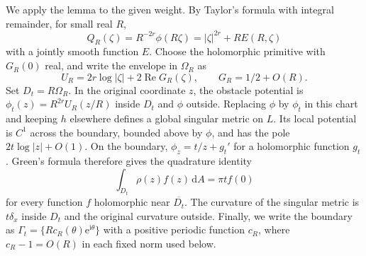 We apply the lemma to the given weight. By Taylor's formula with integral remainder, for small real $R$,
\[
 Q_R(\zeta)=R^{-2r}\phi(R\zeta)
 =|\zeta|^{2r}+R E(R,\zeta)
\]
with a jointly smooth function $E$. Choose the holomorphic primitive with $G_R(0)$ real, and write the envelope in $\Omega_R$ as
\[
 U_R=2r\log|\zeta|+2\operatorname{Re} G_R(\zeta),\qquad
 G_R=1/2+O(R).
\]
Set $D_t=R\Omega_R$. In the original coordinate $z$, the obstacle potential is
$\phi_t(z)=R^{2r}U_R(z/R)$ inside $D_t$ and $\phi$ outside.
Replacing $\phi$ by $\phi_t$ in this chart and keeping $h$ elsewhere defines a global singular metric on $L$. Its local potential is $C^1$ across the boundary, bounded above by $\phi$, and has the pole $2t\log|z|+O(1)$.
On the boundary, $\phi_z=t/z+g_t'$ for a holomorphic function $g_t$. Green's formula therefore gives the quadrature identity
\begin{equation}\label{eq:curvature-quadrature-identity}
 \int_{D_t}\rho(z)f(z)\,\mathrm dA=\pi t f(0)
\end{equation}
for every function $f$ holomorphic near $\overline{D_t}$. The curvature of the singular metric is $t\delta_x$ inside $D_t$ and the original curvature outside. Finally, we write the boundary as $\Gamma_t=\{R c_R(\theta)\mathrm{e}^{\mathrm{i}\theta}\}$ with a positive periodic function $c_R$, where $c_R-1=O(R)$ in each fixed norm used below.
